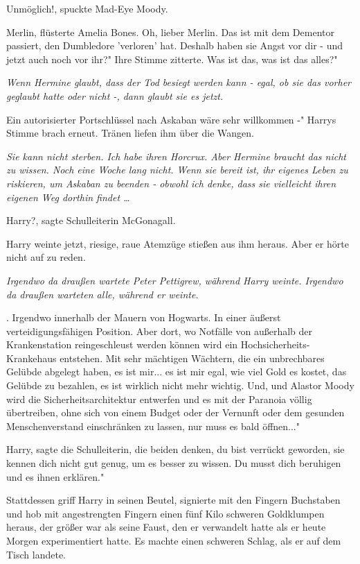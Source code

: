 \glqq Unmöglich!\grqq{}, spuckte Mad-Eye Moody.

\glqq Merlin\grqq{}, flüsterte Amelia Bones. \glqq Oh, lieber Merlin. Das ist
mit dem Dementor passiert, den Dumbledore 'verloren' hat. Deshalb haben sie
Angst vor dir - und jetzt auch noch vor ihr?" Ihre Stimme zitterte. \glqq Was
ist das, was ist das alles?"

\emph{Wenn Hermine glaubt, dass der Tod besiegt werden kann - egal, ob sie das
vorher geglaubt hatte oder nicht -, dann glaubt sie es jetzt.}

\glqq Ein autorisierter Portschlüssel nach Askaban wäre sehr willkommen -"
Harrys Stimme brach erneut. Tränen liefen ihm über die Wangen.

\emph{Sie kann nicht sterben. Ich habe ihren Horcrux. Aber Hermine braucht das
nicht zu wissen. Noch eine Woche lang nicht. Wenn sie bereit ist, ihr eigenes
Leben zu riskieren, um Askaban zu beenden - obwohl ich denke, dass sie
vielleicht ihren eigenen Weg dorthin findet …}

Harry?\grqq{}, sagte Schulleiterin McGonagall.

Harry weinte jetzt, riesige, raue Atemzüge stießen aus ihm heraus. Aber er hörte
nicht auf zu reden.

\emph{Irgendwo da draußen wartete Peter Pettigrew, während Harry weinte.
Irgendwo da draußen warteten alle, während er weinte.}

. Irgendwo innerhalb der Mauern von Hogwarts. In einer äußerst
verteidigungsfähigen Position. Aber dort, wo Notfälle von außerhalb der
Krankenstation reingeschleust werden können wird ein Hochsicherheits-Krankehaus
entstehen. Mit sehr mächtigen Wächtern, die ein unbrechbares Gelübde abgelegt
haben, es ist mir... es ist mir egal, wie viel Gold es kostet, das Gelübde zu
bezahlen, es ist wirklich nicht mehr wichtig. Und, und Alastor Moody wird die
Sicherheitsarchitektur entwerfen und es mit der Paranoia völlig übertreiben,
ohne sich von einem Budget oder der Vernunft oder dem gesunden Menschenverstand
einschränken zu lassen, nur muss es bald öffnen..."

\glqq Harry\grqq{}, sagte die Schulleiterin, \glqq die beiden denken, du bist
verrückt geworden, sie kennen dich nicht gut genug, um es besser zu wissen. Du
musst dich beruhigen und es ihnen erklären."

Stattdessen griff Harry in seinen Beutel, signierte mit den Fingern Buchstaben
und hob mit angestrengten Fingern einen fünf Kilo schweren Goldklumpen heraus,
der größer war als seine Faust, den er verwandelt hatte als er heute Morgen
experimentiert hatte. Es machte einen schweren Schlag, als er auf dem Tisch
landete.

